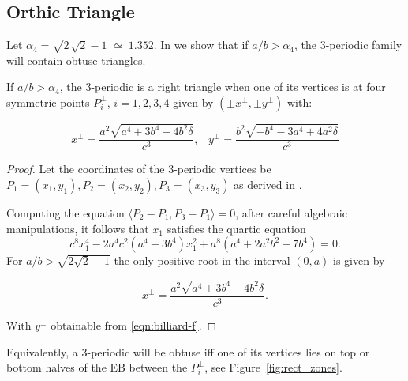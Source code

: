 \subsection{Orthic Triangle}
\label{sec:cb_ort}

Let $\alpha_4=\sqrt{2\,\sqrt {2}-1}\;{\simeq}\;1.352$. In \cite[Thm. 1]{reznik2020-ballet} we show that if $a/b>\alpha_4$, the 3-periodic family will contain obtuse triangles.

\begin{proposition}
If $a/b>\alpha_4$, the 3-periodic is a right triangle when one of its vertices is at four symmetric points $P^\perp_i$, $i=1,2,3,4$ given by $({\pm}x^\perp,{\pm}y^\perp)$ with:

\begin{equation}
x^\perp=\frac{a^2 \sqrt{a^4+3 b^4-4 b^2 \delta }}{c^3},\;\;\;
y^\perp=\frac{b^2 \sqrt{-b^4-3 a^4+4 a^2 \delta }}{c^3}
\label{eqn:perp}
\end{equation}
\label{prop:right-triangle}
\end{proposition}

\begin{proof}
Let the coordinates of the 3-periodic vertices be $P_1=(x_1,y_1),P_2=(x_2,y_2),P_3=(x_3,y_3)$   as derived in \cite{garcia2019-incenter}.

Computing the equation $\langle P_2-P_1,P_3-P_1\rangle=0$, after careful algebraic manipulations, it follows that $x_1$ satisfies the quartic equation
\[ c^8 x_1^4-2a^4c^2(a^4+3b^4)x_1^2+a^8(a^4+2a^2b^2-7b^4)=0.\] 
For $a/b>\sqrt{2\sqrt{2}-1} $ the only
  positive root in the interval $(0,a)$ is given by

\begin{equation}
x^{\perp}=\frac{a^2 \sqrt{a^4+3 b^4-4 b^2 \delta }}{c^3}.
\label{eqn:xperp}
\end{equation}

\noindent With $y^\perp$ obtainable from \eqref{eqn:billiard-f}.
\end{proof}

Equivalently, a 3-periodic will be obtuse iff one of its vertices lies on top or bottom halves of the EB between the $P_i^\perp$, see Figure~\ref{fig:rect_zones}.

